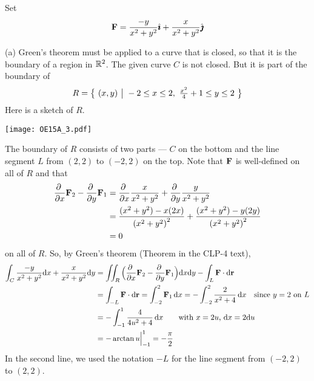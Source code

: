 \begin{solution} 
Set
\begin{equation*}
\mathbf{F}=\frac{-y}{x^2+y^2}\hat{\pmb{\imath}} + \frac{x}{x^2+y^2}\hat{\pmb{\jmath}}
\end{equation*}

(a) Green's theorem must be applied to a curve that is closed,
so that it is the boundary of a region in $\mathbb{R}^2$. The given curve $C$
is not closed. But it is  part of the boundary of 
\begin{equation*}
R = \Set{(x,y)}{-2\le x\le 2,\ \tfrac{x^2}{4}+1\le y\le 2}
\end{equation*}
Here is a sketch of $R$.
 \begin{center}
    \texttt{[image: OE15A\_3.pdf]}
\end{center}

The boundary of $R$ consists of two parts --- $C$ on the bottom
and the line segment $L$ from $(2,2)$ to $(-2,2)$ on the top.
Note that $\mathbf{F}$ is well-defined on all of $R$ and that
\begin{align*}
\pdiff{}{x} \vF_2 - 
\pdiff{}{y} \vF_1 
&=\pdiff{}{x} \frac{x}{x^2+y^2} +
\pdiff{}{y} \frac{y}{x^2+y^2} \\
&=\frac{(x^2+y^2) - x(2x)}{{(x^2+y^2)}^2}
  +\frac{(x^2+y^2) - y(2y)}{{(x^2+y^2)}^2} \\
&=0
\end{align*}
on all of $R$. So, by Green's theorem (Theorem  in the CLP-4 text), 
\begin{align*}
\int_C \frac{-y}{x^2+y^2}\dee{x} + \frac{x}{x^2+y^2}\dee{y}
&=\dblInt_R \Big(\pdiff{}{x} \vF_2 - 
          \pdiff{}{y} \vF_1 \Big)\dee{x}\dee{y}
 - \int_L\vF\cdot\dee{\vr} \\
&=\int_{-L}\vF\cdot\dee{\vr} 
  =\int_{-2}^2 \vF_1\,\dee{x}
  =-\int_{-2}^2\frac{2}{x^2+4} \,\dee{x}\quad\text{since $y=2$ on $L$} \\
&=-\int_{-1}^1\frac{4}{4u^2+4} \,\dee{x}
\qquad\text{with $x=2u$, $\dee{x}=2\dee{u}$} \\
&=-\arctan u\Big|_{-1}^1 =-\frac{\pi}{2}
\end{align*}
In the second line, we used the notation $-L$ for the line segment
from $(-2,2)$ to $(2,2)$.


\end{solution}
